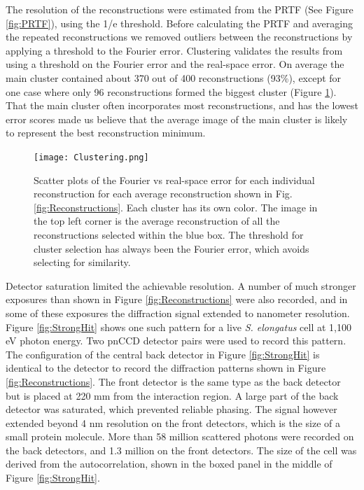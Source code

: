 The resolution of the reconstructions were estimated from the PRTF (See Figure \ref{fig:PRTF}), using the 1/e threshold. Before calculating the PRTF and averaging the repeated reconstructions we removed outliers between the reconstructions by applying a threshold to the Fourier error. Clustering validates the results from using a threshold on the Fourier error and the real-space error. On average the main cluster contained about 370 out of 400 reconstructions (93\%), except for one case where only 96 reconstructions formed the biggest cluster (Figure \ref{fig:Clustering}). That the main cluster often incorporates most reconstructions, and has the lowest error scores made us believe that the average image of the main cluster is likely to represent the best reconstruction minimum. 

\begin{figure}[!ht]
	\centering 
		\texttt{[image: Clustering.png]}
	\caption{Scatter plots of the Fourier vs real-space error for each individual reconstruction for each average reconstruction shown in Fig. \ref{fig:Reconstructions}. Each cluster has its own color. The image in the top left corner is the average reconstruction of all the reconstructions selected within the blue box. The threshold for cluster selection has always been the Fourier error, which avoids selecting for similarity. }
	\label{fig:Clustering}
\end{figure}

Detector saturation limited the achievable resolution. A number of much stronger exposures than shown in Figure \ref{fig:Reconstructions} were also recorded, and in some of these exposures the diffraction signal extended to nanometer resolution. Figure \ref{fig:StrongHit} shows one such pattern for a live \textit{S. elongatus} cell at 1,100 eV photon energy. Two pnCCD detector pairs were used to record this pattern. The configuration of the central back detector in Figure \ref{fig:StrongHit} is identical to the detector to record the diffraction patterns shown in Figure \ref{fig:Reconstructions}. The front detector is the same type as the back detector but is placed at 220 mm from the interaction region. A large part of the back detector was saturated, which prevented reliable phasing. The signal however extended beyond 4 nm resolution on the front detectors, which is the size of a small protein molecule. More than 58 million scattered photons were recorded on the back detectors, and 1.3 million on the front detectors. The size of the cell was derived from the autocorrelation, shown in the boxed panel in the middle of Figure \ref{fig:StrongHit}. 

